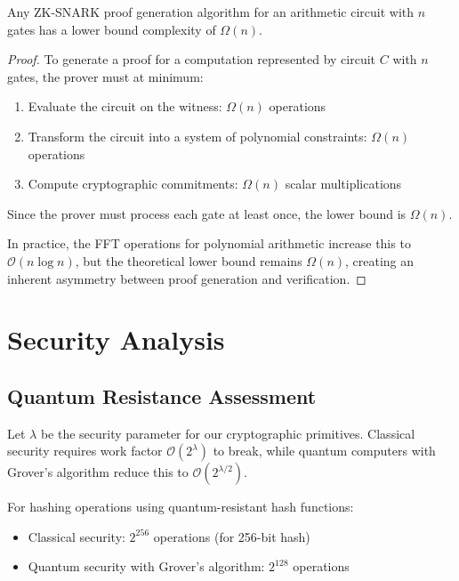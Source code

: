 \documentclass[12pt]{article}
\begin{document}
\begin{theorem}
Any ZK-SNARK proof generation algorithm for an arithmetic circuit with $n$ gates has a lower bound complexity of $\Omega(n)$.
\end{theorem}

\begin{proof}
To generate a proof for a computation represented by circuit $C$ with $n$ gates, the prover must at minimum:
\begin{enumerate}
\item Evaluate the circuit on the witness: $\Omega(n)$ operations
\item Transform the circuit into a system of polynomial constraints: $\Omega(n)$ operations
\item Compute cryptographic commitments: $\Omega(n)$ scalar multiplications
\end{enumerate}

Since the prover must process each gate at least once, the lower bound is $\Omega(n)$.

In practice, the FFT operations for polynomial arithmetic increase this to $\mathcal{O}(n \log n)$, but the theoretical lower bound remains $\Omega(n)$, creating an inherent asymmetry between proof generation and verification.
\end{proof}

\section{Security Analysis}

\subsection{Quantum Resistance Assessment}

Let $\lambda$ be the security parameter for our cryptographic primitives. Classical security requires work factor $\mathcal{O}(2^\lambda)$ to break, while quantum computers with Grover's algorithm reduce this to $\mathcal{O}(2^{\lambda/2})$.

For hashing operations using quantum-resistant hash functions:
\begin{itemize}
\item Classical security: $2^{256}$ operations (for 256-bit hash)
\item Quantum security with Grover's algorithm: $2^{128}$ operations
\end{itemize}
\end{document}
